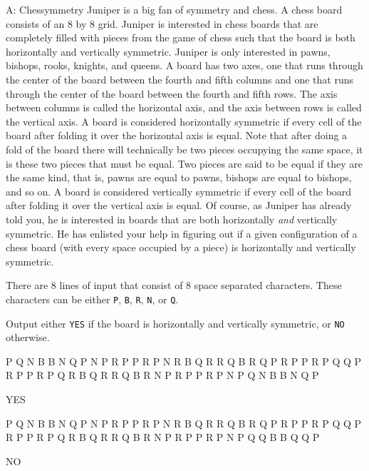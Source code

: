 \begin{problem}{A: Chessymmetry} 
Juniper is a big fan of symmetry and chess.
A chess board consists of an 8 by 8 grid.
Juniper is interested in chess boards that are completely filled with pieces from the game of chess such that the board is both horizontally and vertically symmetric.
Juniper is only interested in pawns, bishops, rooks, knights, and queens.
A board has two axes, one that runs through the center of the board between the fourth and fifth columns and one that runs through the center of the board between the fourth and fifth rows.
The axis between columns is called the horizontal axis, and the axis between rows is called the vertical axis.
A board is considered horizontally symmetric if every cell of the board after folding it over the horizontal axis is equal.
Note that after doing a fold of the board there will technically be two pieces occupying the same space, it is these two pieces that must be equal.
Two pieces are said to be equal if they are the same kind, that is, pawns are equal to pawns, bishops are equal to bishops, and so on.
A board is considered vertically symmetric if every cell of the board after folding it over the vertical axis is equal.
Of course, as Juniper has already told you, he is interested in boards that are both horizontally \textit{and} vertically symmetric.
He has enlisted your help in figuring out if a given configuration of a chess board (with every space occupied by a piece) is horizontally and vertically symmetric.
\end{problem}

\begin{formalin}
There are 8 lines of input that consist of 8 space separated characters.
These characters can be either \texttt{P}, \texttt{B}, \texttt{R}, \texttt{N}, or \texttt{Q}.
\end{formalin}

\begin{formalout}
Output either \texttt{YES} if the board is horizontally and vertically symmetric, or \texttt{NO} otherwise. 
\end{formalout}

\begin{datain}
P Q N B B N Q P
N P R P P R P N
R B Q R R Q B R
Q P R P P R P Q
Q P R P P R P Q
R B Q R R Q B R
N P R P P R P N
P Q N B B N Q P
\end{datain}
\begin{dataout}
YES
\end{dataout}

\begin{datain}
P Q N B B N Q P
N P R P P R P N
R B Q R R Q B R
Q P R P P R P Q
Q P R P P R P Q
R B Q R R Q B R
N P R P P R P N
P Q Q B B Q Q P
\end{datain}
\begin{dataout}
NO
\end{dataout}
